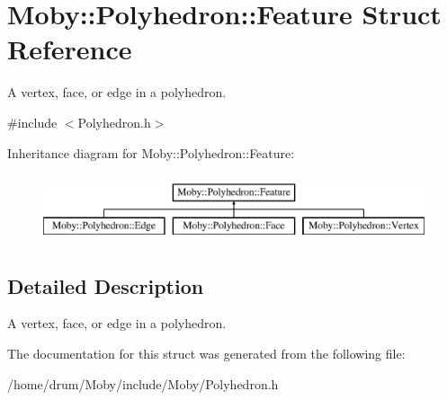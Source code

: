 \section{Moby\-:\-:Polyhedron\-:\-:Feature Struct Reference}
\label{structMoby_1_1Polyhedron_1_1Feature}


A vertex, face, or edge in a polyhedron.  




{\ttfamily \#include $<$Polyhedron.\-h$>$}

Inheritance diagram for Moby\-:\-:Polyhedron\-:\-:Feature\-:\begin{figure}[H]
\begin{center}
\leavevmode
\includegraphics[height=2.000000cm]{structMoby_1_1Polyhedron_1_1Feature}
\end{center}
\end{figure}


\subsection{Detailed Description}
A vertex, face, or edge in a polyhedron. 

The documentation for this struct was generated from the following file\-:\begin{DoxyCompactItemize}
\item 
/home/drum/\-Moby/include/\-Moby/Polyhedron.\-h\end{DoxyCompactItemize}
